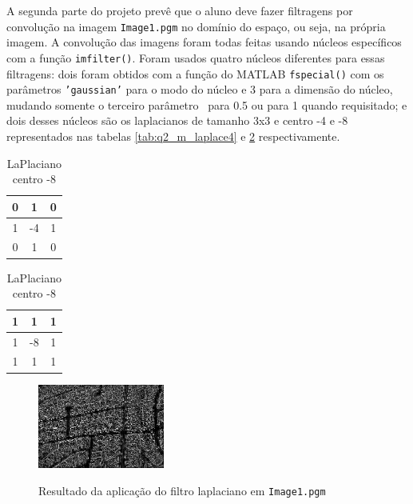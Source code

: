 \documentclass[conference]{IEEEtran}
\begin{document}
A segunda parte do projeto prevê que o aluno deve fazer filtragens por convolução na imagem \texttt{Image1.pgm} no domínio do espaço, ou seja, na própria imagem. A convolução das imagens foram todas feitas usando núcleos específicos com a função \texttt{imfilter()}. Foram usados quatro núcleos diferentes para essas filtragens: dois foram obtidos com a função do MATLAB \texttt{fspecial()} com os parâmetros \texttt{'gaussian'} para o modo do núcleo e 3 para a dimensão do núcleo, mudando somente o terceiro parâmetro \textsigma\ para 0.5 ou para 1 quando requisitado; e dois desses núcleos são os laplacianos de tamanho 3x3 e centro -4 e -8 representados nas tabelas \ref{tab:q2_m_laplace4} e \ref{tab:q2_m_laplace8} respectivamente.

\begin{table}
    \centering
    \begin{minipage}{.49\linewidth}
        \caption{LaPlaciano centro -4}
        \centering
        \begin{tabular}{|c|c|c|}
            \hline
            0 & 1 & 0 \\
            \hline
            1 & -4 & 1 \\
            \hline
            0 & 1 & 0 \\
            \hline
        \end{tabular}
        \label{tab:q2_m_laplace4}
    \end{minipage}
    \begin{minipage}{.49\linewidth}
        \caption{LaPlaciano centro -8}
        \centering
        \begin{tabular}{|c|c|c|}
            \hline
            1 & 1 & 1 \\
            \hline
            1 & -8 & 1 \\
            \hline
            1 & 1 & 1 \\
            \hline
        \end{tabular}
        \label{tab:q2_m_laplace8}
    \end{minipage}
\end{table}

\begin{figure}
    \centering
    \includegraphics[width=0.37\textwidth]{imgs/Q2-2 LaPlace filtered (k 3x3 c-8).png}
    \caption\scriptsize{Resultado da aplicação do filtro laplaciano em \texttt{Image1.pgm}}
    \label{fig:q2_m_laplaceFilter3x3c8}
\end{figure}
\end{document}
